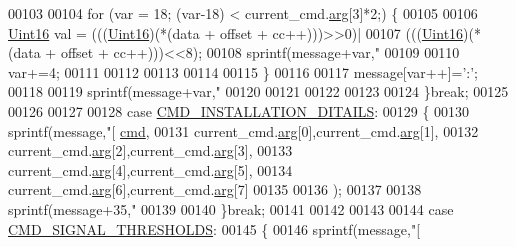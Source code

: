 \begin{DoxyCode}
{{{{{00103 
00104        \textcolor{keywordflow}{for} (var = 18; (var-18) < current\_cmd.\hyperlink{a00001_a56e6c2d7315d0ae60a51e8b140c9cfe4}{arg}[3]*2;) \{
00105 
00106           \hyperlink{a00001_aae7407b021d43f7193a81a58cfb3e297}{Uint16} val = (((\hyperlink{a00001_aae7407b021d43f7193a81a58cfb3e297}{Uint16})(*(data + offset + cc++)))>>0)|
00107                   (((\hyperlink{a00001_aae7407b021d43f7193a81a58cfb3e297}{Uint16})(*(data + offset + cc++)))<<8);
00108           sprintf(message+var,\textcolor{stringliteral}{"%
00109 
00110           var+=4;
00111 
00112 
00113 
00114 
00115        \}
00116 
00117        message[var++]=\textcolor{charliteral}{':'};
00118 
00119        sprintf(message+var,\textcolor{stringliteral}{"%
00120 
00121 
00122 
00123 
00124        \}\textcolor{keywordflow}{break};
00125 
00126 
00127 
00128        \textcolor{keywordflow}{case} \hyperlink{a00031_af91ff280feea1f52e3bdd7f0f556d153}{CMD\_INSTALLATION\_DITAILS}:
00129        \{
00130        sprintf(message,\textcolor{stringliteral}{"[%
      \hyperlink{a00001_af20664dc9ca2b752c73d524edee0e07a}{cmd},
00131                                     current\_cmd.\hyperlink{a00001_a56e6c2d7315d0ae60a51e8b140c9cfe4}{arg}[0],current\_cmd.\hyperlink{a00001_a56e6c2d7315d0ae60a51e8b140c9cfe4}{arg}[1],
00132                                     current\_cmd.\hyperlink{a00001_a56e6c2d7315d0ae60a51e8b140c9cfe4}{arg}[2],current\_cmd.\hyperlink{a00001_a56e6c2d7315d0ae60a51e8b140c9cfe4}{arg}[3],
00133                                     current\_cmd.\hyperlink{a00001_a56e6c2d7315d0ae60a51e8b140c9cfe4}{arg}[4],current\_cmd.\hyperlink{a00001_a56e6c2d7315d0ae60a51e8b140c9cfe4}{arg}[5],
00134                                     current\_cmd.\hyperlink{a00001_a56e6c2d7315d0ae60a51e8b140c9cfe4}{arg}[6],current\_cmd.\hyperlink{a00001_a56e6c2d7315d0ae60a51e8b140c9cfe4}{arg}[7]
00135 
00136                                     );
00137 
00138        sprintf(message+35,\textcolor{stringliteral}{"%
00139 
00140        \}\textcolor{keywordflow}{break};
00141 
00142 
00143 
00144        \textcolor{keywordflow}{case} \hyperlink{a00031_ac361dc1b32c1036394be0fd7de1182ca}{CMD\_SIGNAL\_THRESHOLDS}:
00145        \{
00146        sprintf(message,\textcolor{stringliteral}{"[%
}}}}}}}}}}
\end{DoxyCode}
